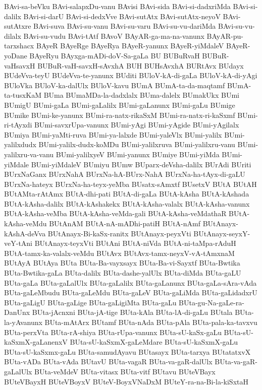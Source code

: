{BAvi-sa-beVku
BAvi-salapxDu-vanu
BAvisi
BAvi-sida
BAvi-si-dadxriMda
BAvi-si-dalilx
BAvi-si-darU
BAvi-si-dedxVve
BAvi-sutAtx
BAvi-sutAtx-neyoV
BAvi-sutAtxre
BAvi-suva
BAvi-su-vanu
BAvi-su-varu
BAvi-su-vu-dariMda
BAvi-su-vu-dilalx
BAvi-su-vudu
BAvi-tAtf
BAvoV
BAyAR-ga-ma-na-vanunx
BAyAR-pu-tarxshacx
BAyeR
BAyeRge
BAyeRya
BAyeR-yanunx
BAyeR-yiMdaleV
BAyeR-yoDane
BAyeRyu
BAyxga-mADi-doV-Sa-gaLa
BU
BUBuRvaH
BUBuR-vaHsavxH
BUBuR-vaH-savxH-sAvxhA
BUH
BUHsAvxhA
BURtAvx
BUdayx
BUdeVva-teyU
BUdeVva-te-yanunx
BUditi
BUloV-kA-di-gaLa
BUloV-kA-di-yAgi
BUloVka
BUloV-ka-dalUlx
BUloV-kavu
BUmA
BUmA-ta-da-maqtamf
BUmA-ta-tusxKaM
BUma
BUmaMDa-la-dadxlalx
BUma-dalelx
BUmakUkx
BUmi
BUmigU
BUmi-gaLa
BUmi-gaLalilx
BUmi-gaLanunx
BUmi-gaLu
BUmige
BUmike
BUmi-ke-yanunx
BUmi-ra-natx-rikaSxM
BUmi-ra-natx-ri-kaSxmf
BUmi-ri-tAyxdi
BUmi-savxrUpa-vanunx
BUmi-yAgi
BUmi-yAgide
BUmi-yAgilalx
BUmiya
BUmi-yaMti-ruva
BUmi-ya-lalxde
BUmi-yaleVlx
BUmi-yalilx
BUmi-yalilxdudx
BUmi-yalilx-dudx-koMDu
BUmi-yalilxruva
BUmi-yalilxru-vanu
BUmi-yalilxru-va-vanu
BUmi-yalilxyeV
BUmi-yanunx
BUmiye
BUmi-yiMda
BUmi-yiMdale
BUmi-yiMdaleV
BUmiyu
BUmw
BUparx-deVsha-dalilx
BUrAdi
BUriti
BUrxNaGanx
BUrxNahA
BUrxNa-hA-BUrx-NahA
BUrxNa-ha-tAyx-di-gaLU
BUrxNa-hateyx
BUrxNa-ha-teyx-yeMba
BUsatx-sAmxtf
BUsetxV
BUtA
BUtAH
BUtAMta-rAtAmx
BUtA-dhi-pati
BUtA-di-gaLa
BUtA-kAsha
BUtA-kAshada
BUtA-kAsha-dalilx
BUtA-kAshakekx
BUtA-kAsha-valalx
BUtA-kAsha-vanunx
BUtA-kAsha-veMba
BUtA-kAsha-veMda-gali
BUtA-kAsha-veMdathaR
BUtA-kAsha-veMdu
BUtAnAM
BUtA-nA-mADhi-patiH
BUtA-nAmf
BUtAnayx-kAshA-deVva
BUtAnayx-Bi-kaSx-ranitx
BUtAnayx-peyxVti
BUtAnayx-seyxY-veY-tAni
BUtAnayx-teyxVti
BUtAni
BUtA-niVda
BUtA-ni-taMpa-rAduH
BUtA-tamx-ka-valalx-veMdu
BUtAvx
BUtAvx-tamx-neyxV-vA-tAmxnaM
BUtAyA
BUtAya
BUta
BUta-Ba-vayxsayx
BUta-Ba-vi-Sayxtf
BUta-Bwtika
BUta-Bwtika-gaLa
BUta-dalilx
BUta-dashe-yalUlx
BUta-diMda
BUta-gaLU
BUta-gaLa
BUta-gaLalUlx
BUta-gaLalilx
BUta-gaLanunx
BUta-gaLa-sAra-vAda
BUta-gaLeMbudu
BUta-gaLeMdu
BUta-gaLeV
BUta-gaLiMda
BUta-gaLidadxrU
BUta-gaLigU
BUta-gaLige
BUta-gaLigiMta
BUta-gaLu
BUta-gu-Na-gaLe-ra-DanUnx
BUta-jAcnxni
BUta-jA-tige
BUta-kAla
BUta-lA-di-gaLu
BUtala
BUta-la-yAvanunx
BUta-mAtArx
BUtamf
BUta-nAda
BUta-pAla
BUta-pala-ka-tavxvu
BUta-perxVta
BUta-rA-shiya
BUta-rUpa-vanunx
BUta-sU-kaSx-gaLu
BUta-sU-kaSxmX-gaLanenxV
BUta-sU-kaSxmX-gaLeMdare
BUta-sU-kaSxmX-gaLu
BUta-sU-kaSxmx-gaLu
BUta-samudAyavu
BUtasayx
BUta-tarxya
BUtatatxvX
BUta-vADa
BUta-vAda
BUtavU
BUta-vagaR
BUta-va-gaR-dalUlx
BUta-va-gaR-gaLalUlx
BUta-veMdeV
BUta-vitasx
BUta-vitf
BUtavu
BUteVBayx
BUteVBayxH
BUteVBoyxV
BUteV-BoyxVNaDxM
BUteY-ra-na-Bi-la-kiSxtaH
}
